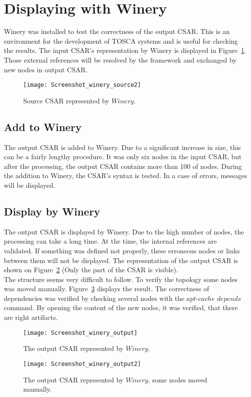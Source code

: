 \section{Displaying with Winery}\label{sec:checkwin}
Winery was installed to test the correctness of the output CSAR. 
 This is an environment for the development of TOSCA systems and is useful for checking the results. %
 The input CSAR's representation by Winery is displayed in Figure~\ref{fig:winery_source2}.
 Those external references will be resolved by the framework and exchanged by new nodes in output CSAR. 
 \begin{figure}[ht]   
 	\centering
 	\texttt{[image: Screenshot\_winery\_source2]}
 	\caption{Source CSAR represented by $Winery$.}
 	\label{fig:winery_source2}
 \end{figure}
   
 \subsection*{Add to Winery}
 The output CSAR is added to Winery.
 Due to a significant increase in size, this can be a fairly lengthy procedure.
 It was only six nodes in the input CSAR, but after the processing, the output CSAR contains more than 100 of nodes.
 During the addition to Winery, the CSAR's syntax is tested.
 In a case of errors, messages will be displayed.
 
 \subsection*{Display by Winery}
 The output CSAR is displayed by Winery.
Due to the high number of nodes, the processing can take a long time. 
 At the time, the  internal references are validated.
 If something was defined not properly, these erroneous nodes or links between them will not be displayed.
The representation of the output CSAR is shown on Figure~\ref{fig:winery_output} (Only the part of the CSAR is visible).\\
 The structure seems very difficult to follow.
 To verify the topology some nodes was moved manually. 
 Figure~\ref{fig:winery_output2} displays the result. 
 The correctness of dependencies was verified by checking several nodes with the $apt$-$cache$ $depends$ command.
 By opening the content of the new nodes, it was verified, that there are right artifacts.
 \begin{figure}[ht]   
 	\centering
 	\texttt{[image: Screenshot\_winery\_output]}  
 	\caption{The output CSAR represented by $Winery$.}
 	\label{fig:winery_output}
 \end{figure}
 \begin{figure}[ht]   
 	\centering
 	\texttt{[image: Screenshot\_winery\_output2]}
 	\caption{The output CSAR represented by $Winery$, some nodes moved manually.}
 	\label{fig:winery_output2}
 \end{figure}

